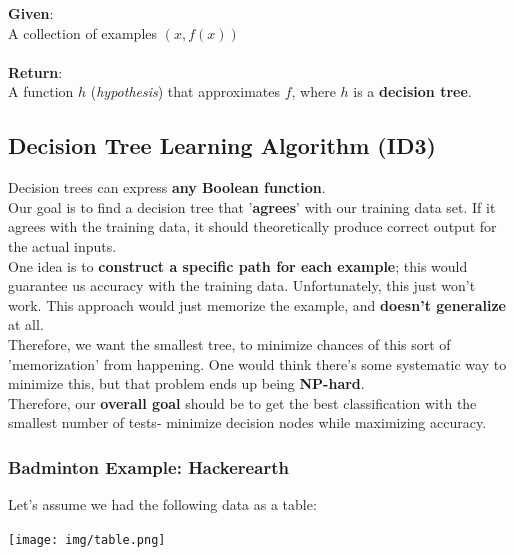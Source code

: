 \documentclass[english, 10pt]{article}
\begin{document}
\begin{myproof}
\textbf{Given}:\\
A collection of examples $(x, f(x))$\\\\

\textbf{Return}:\\
A function $h$ (\textit{hypothesis}) that approximates $f$, where $h$ is a \textbf{decision tree}.
\end{myproof}


\subsection{Decision Tree Learning Algorithm (ID3)}

Decision trees can express \textbf{any Boolean function}.\\

Our goal is to find a decision tree that '\textbf{agrees}' with our training data set. If it agrees with the training data, it should theoretically produce correct output for the actual inputs.\\

One idea is to \textbf{construct a specific path for each example}; this would guarantee us accuracy with the training data. Unfortunately, this just won't work. This approach would just memorize the example, and \textbf{doesn't generalize} at all.\\

Therefore, we want the smallest tree, to minimize chances of this sort of 'memorization' from happening. One would think there's some systematic way to minimize this, but that problem ends up being \textbf{NP-hard}.\\

Therefore, our \textbf{overall goal} should be to get the best classification with the smallest number of tests- minimize decision nodes while maximizing accuracy.\\

\subsubsection{Badminton Example: Hackerearth}

Let's assume we had the following data as a table:

\begin{center}
	\texttt{[image: img/table.png]} 
\end{center}
\end{document}
